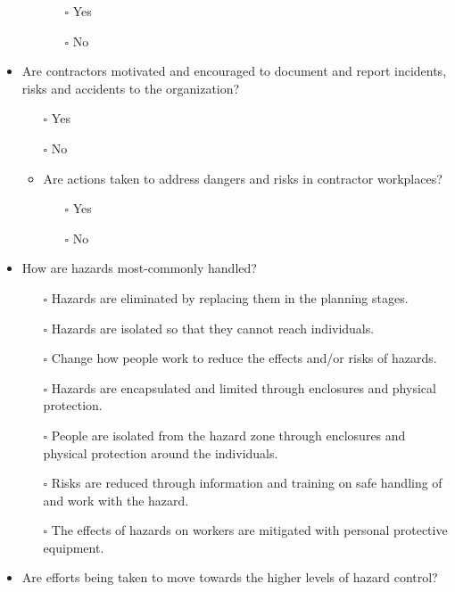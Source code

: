 \documentclass[
  12pt,
]{scrbook}
\providecommand{\tightlist}{%
  \setlength{\itemsep}{0pt}\setlength{\parskip}{0pt}}
\begin{document}
\begin{itemize}
\begin{itemize}
    \begin{itemize}
    \tightlist
    \item[$\square$]
      Yes
    \item[$\square$]
      No
    \end{itemize}
  \end{itemize}
\item
  Are contractors motivated and encouraged to document and report incidents, risks and accidents to the organization?

  \begin{itemize}
  \item[$\square$]
    Yes
  \item[$\square$]
    No
  \item
    Are actions taken to address dangers and risks in contractor workplaces?

    \begin{itemize}
    \tightlist
    \item[$\square$]
      Yes
    \item[$\square$]
      No
    \end{itemize}
  \end{itemize}
\item
  How are hazards most-commonly handled?

  \begin{itemize}
  \tightlist
  \item[$\square$]
    Hazards are eliminated by replacing them in the planning stages.
  \item[$\square$]
    Hazards are isolated so that they cannot reach individuals.
  \item[$\square$]
    Change how people work to reduce the effects and/or risks of hazards.
  \item[$\square$]
    Hazards are encapsulated and limited through enclosures and physical protection.
  \item[$\square$]
    People are isolated from the hazard zone through enclosures and physical protection around the individuals.
  \item[$\square$]
    Risks are reduced through information and training on safe handling of and work with the hazard.
  \item[$\square$]
    The effects of hazards on workers are mitigated with personal protective equipment.
  \end{itemize}
\item
  Are efforts being taken to move towards the higher levels of hazard control?


\end{itemize}
\end{document}
